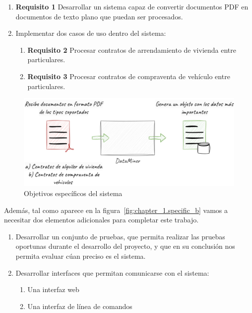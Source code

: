\begin{enumerate}
    \item \textbf{Requisito 1} Desarrollar un sistema capaz de convertir documentos PDF en documentos de texto
    plano que puedan ser procesados\label{req:transform_pdf_to_text}.
    \item Implementar dos casos de uso dentro del sistema:
    \begin{enumerate}
        \item \textbf{Requisito 2} Procesar contratos de arrendamiento de vivienda entre
        particulares\label{req:residence_lease_agreement}.
        \item \textbf{Requisito 3} Procesar contratos de compraventa de vehículo entre
        particulares\label{req:sale_and_purchase_agreement}.
    \end{enumerate}
\end{enumerate}

\begin{figure}[ht]
    \begin{center}
        \includegraphics[width=\textwidth]{chapter/1/images/chapter_1.specific_a}
        \caption{Objetivos específicos del sistema}
        \label{fig:chapter_1.specific_a}
    \end{center}
\end{figure}

Además, tal como aparece en la figura~\ref{fig:chapter_1.specific_b} vamos a necesitar dos elementos adicionales para
completar este trabajo.

\begin{enumerate}
    \item Desarrollar un conjunto de pruebas, que permita realizar las pruebas oportunas durante el desarrollo del
    proyecto, y que en su conclusión nos permita evaluar cúan preciso es el sistema.
    \item Desarrollar interfaces que permitan comunicarse con el sistema:
    \begin{enumerate}
        \item  Una interfaz web
        \item  Una interfaz de línea de comandos
    \end{enumerate}
\end{enumerate}


